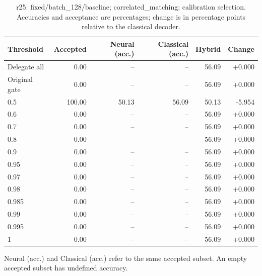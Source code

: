 \begin{table}[htbp]
\centering\small
\setlength{\tabcolsep}{3pt}
\caption{r25: fixed/batch\_128/baseline; correlated\_matching; calibration selection. Accuracies and acceptance are percentages; change is in percentage points relative to the classical decoder.}
\begin{tabular}{lrrrrr}
\toprule
Threshold & Accepted & Neural (acc.) & Classical (acc.) & Hybrid & Change \\
\midrule
Delegate all & 0.00 & -- & -- & 56.09 & +0.000 \\
Original gate & 0.00 & -- & -- & 56.09 & +0.000 \\
0.5 & 100.00 & 50.13 & 56.09 & 50.13 & -5.954 \\
0.6 & 0.00 & -- & -- & 56.09 & +0.000 \\
0.7 & 0.00 & -- & -- & 56.09 & +0.000 \\
0.8 & 0.00 & -- & -- & 56.09 & +0.000 \\
0.9 & 0.00 & -- & -- & 56.09 & +0.000 \\
0.95 & 0.00 & -- & -- & 56.09 & +0.000 \\
0.97 & 0.00 & -- & -- & 56.09 & +0.000 \\
0.98 & 0.00 & -- & -- & 56.09 & +0.000 \\
0.985 & 0.00 & -- & -- & 56.09 & +0.000 \\
0.99 & 0.00 & -- & -- & 56.09 & +0.000 \\
0.995 & 0.00 & -- & -- & 56.09 & +0.000 \\
1 & 0.00 & -- & -- & 56.09 & +0.000 \\
\bottomrule
\end{tabular}
\par\smallskip\footnotesize Neural (acc.) and Classical (acc.) refer to the same accepted subset. An empty accepted subset has undefined accuracy.
\end{table}
